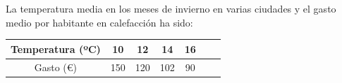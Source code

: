 \documentclass[addpoints,spanish, 12pt,a4paper]{exam}
\begin{document}
\begin{questions}

\question La temperatura media en los meses de invierno en varias ciudades y el gasto medio por habitante en
calefacción ha sido:\\
\begin{tabular}{|c||c|c|c|c|c|c|}
\hline 
Temperatura (ºC) & 10 & 12 & 14 & 16  \\ 
\hline 
Gasto (\euro ) & 150 & 120 & 102 & 90  \\ 
\hline 
\end{tabular} 
\addpoints %

\end{questions}
\end{document}
